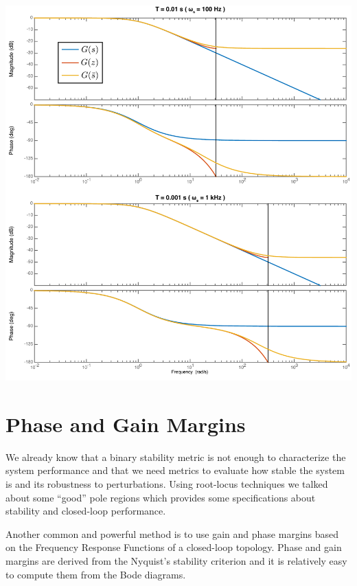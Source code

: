 \documentclass[twoside]{article}
\begin{document}
\begin{center}
 \begin{minipage}[h]{0.99\linewidth}
     \begin{center}
       \includegraphics[width=\textwidth]{bode_all}
     \end{center}
 \end{minipage}
\end{center}

\newpage

\section*{Phase and Gain Margins}

We already know that a binary stability metric is not enough to
characterize the system performance and that we need metrics
to evaluate how stable the system is and its robustness to
perturbations. Using root-locus techniques we talked about
some ``good'' pole regions which provides some specifications
about stability and closed-loop performance. 

Another common and powerful method is to use gain and phase margins
based on the Frequency Response Functions of a closed-loop topology. 
Phase and gain margins are derived from the Nyquist’s stability
criterion and it is relatively easy to compute them from the Bode diagrams.
\end{document}
